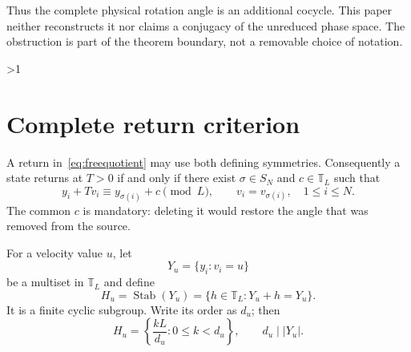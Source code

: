\documentclass[10pt]{article}
\providecommand{\CRevisionRound}{2}
\newcommand{\T}{\mathbb T}
\newcommand{\Stab}{\operatorname{Stab}}
\begin{document}
Thus the complete physical rotation angle is an additional cocycle.  This
paper neither reconstructs it nor claims a conjugacy of the unreduced phase
space.  The obstruction is part of the theorem boundary, not a removable
choice of notation.
\fi

\ifnum\CRevisionRound>1
\section{Complete return criterion}
A return in~\eqref{eq:freequotient} may use both defining symmetries.
Consequently a state returns at $T>0$ if and only if there exist
$\sigma\in S_N$ and $c\in\T_L$ such that
\begin{equation}\label{eq:return}
 y_i+Tv_i\equiv y_{\sigma(i)}+c\pmod L,
 \qquad v_i=v_{\sigma(i)},\quad 1\leq i\leq N.
\end{equation}
The common $c$ is mandatory: deleting it would restore the angle that was
removed from the source.

For a velocity value $u$, let
\[
 Y_u=\{y_i:v_i=u\}
\]
be a multiset in $\T_L$ and define
\[
 H_u=\Stab(Y_u)=\{h\in\T_L:Y_u+h=Y_u\}.
\]
It is a finite cyclic subgroup.  Write its order as $d_u$; then
\begin{equation}\label{eq:Hd}
 H_u=\left\{\frac{kL}{d_u}:0\leq k<d_u\right\},
 \qquad d_u\mid |Y_u|.
\end{equation}
\end{document}
